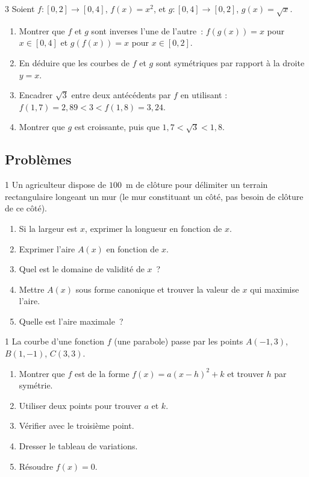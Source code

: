 \begin{exo}{3}
Soient $f:[0,2]\to[0,4]$, $f(x)=x^2$, et
$g:[0,4]\to[0,2]$, $g(x)=\sqrt{x}$.
\begin{enumerate}
  \item Montrer que $f$ et $g$ sont inverses l'une de l'autre~:
        $f(g(x))=x$ pour $x\in[0,4]$ et $g(f(x))=x$ pour $x\in[0,2]$.
  \item En d\'eduire que les courbes de $f$ et $g$ sont sym\'etriques
        par rapport \`a la droite $y=x$.
  \item Encadrer $\sqrt3$ entre deux ant\'ec\'edents par $f$ en utilisant :
        $f(1{,}7)=2{,}89 < 3 < f(1{,}8)=3{,}24$.
  \item Montrer que $g$ est croissante, puis que $1{,}7<\sqrt{3}<1{,}8$.
\end{enumerate}
\end{exo}

\subsection*{Probl\`emes}

\begin{probleme}{1}
Un agriculteur dispose de $100$~m de cl\^oture pour d\'elimiter un terrain
rectangulaire longeant un mur (le mur constituant un c\^ot\'e, pas besoin
de cl\^oture de ce c\^ot\'e).
\begin{enumerate}
  \item Si la largeur est $x$, exprimer la longueur en fonction de $x$.
  \item Exprimer l'aire $A(x)$ en fonction de $x$.
  \item Quel est le domaine de validit\'e de $x$~?
  \item Mettre $A(x)$ sous forme canonique et trouver la valeur de $x$
        qui maximise l'aire.
  \item Quelle est l'aire maximale~?
\end{enumerate}
\end{probleme}

\begin{probleme}{1}
La courbe d'une fonction $f$ (une parabole) passe par les points
$A(-1, 3)$, $B(1,-1)$, $C(3, 3)$.
\begin{enumerate}
  \item Montrer que $f$ est de la forme $f(x)=a(x-h)^2+k$
        et trouver $h$ par sym\'etrie.
  \item Utiliser deux points pour trouver $a$ et $k$.
  \item V\'erifier avec le troisi\`eme point.
  \item Dresser le tableau de variations.
  \item R\'esoudre $f(x)=0$.
\end{enumerate}
\end{probleme}

